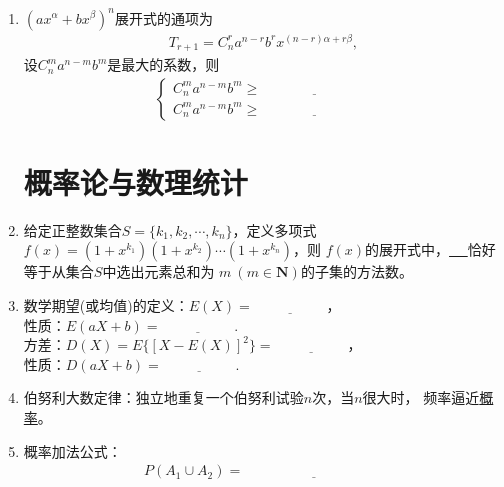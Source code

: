 \documentclass{article}
\newif\ifte
\renewcommand\geq\geqslant
\begin{document}
\begin{multicols}{2}
\begin{enumerate}[leftmargin=20pt]
\item $ \left(ax^{\alpha}+bx^{\beta} \right)^n $展开式的通项为
\begin{gather*}
    T_{r+1}=C_n^ra^{n-r}b^rx^{(n-r)\alpha+r\beta} ,
\end{gather*}
设$ C_n^m a^{n-m}b^m $是最大的系数，则
\begin{align*}
\begin{cases}
    C_n^m a^{n-m}b^m\geq \underline{\ \ifte 
      C_n^{m-1} a^{n-m+1}b^{m-1} \else \hspace{3cm} \fi\ } \\
    C_n^m a^{n-m}b^m\geq \underline{\ \ifte 
      C_n^{m+1} a^{n-m-1}b^{m+1}\else \hspace{3cm} \fi\ }
\end{cases}
\end{align*} 

\section{概率论与数理统计}

\item 给定正整数集合$ S=\{k_1,k_2,\cdots,k_n\} $，定义多项式
$ f(x)=(1+x^{k_1})(1+x^{k_2})\cdots (1+x^{k_n}) $，则
$ f(x) $的展开式中，\underline{\ \ifte $ x^m $的系数\else 
\hspace{2cm} \fi\ }恰好等于从集合$ S $中选出元素总和为
$ m\ (m\in \textbf{N}) $的子集的方法数。

\item 数学期望(或均值)的定义：$ E(X)=\underline{\ \ifte 
\sum\limits_{i=1}^{n}x_ip_i \else \hspace{2cm} \fi\ } $，\\ 
性质：$ E(aX+b)=\underline{\ \ifte
aE(X)+b \else \hspace{2cm} \fi\ } $. \\
方差：$ D(X)=E\{[X-E(X)]^2\}=\underline{\ \ifte E(X^2)-[E(X)]^2
\else \hspace{2cm} \fi\ } $，\\ 性质：$ D(aX+b)=\underline{\ \ifte
a^2D(X) \else \hspace{2cm} \fi\ } $. 

\item 伯努利大数定律：独立地重复一个伯努利试验$ n $次，当$ n $很大时，
频率逼近\underline{概率}。

\item 概率加法公式：
\begin{gather*}
    P(A_1\cup A_2)=\underline{\ \ifte 
    P(A_1)+P(A_2)-P(A_1\cap A_2) \else \hspace{4cm} \fi\ }
\end{gather*}


\end{enumerate}
\end{multicols}
\end{document}
